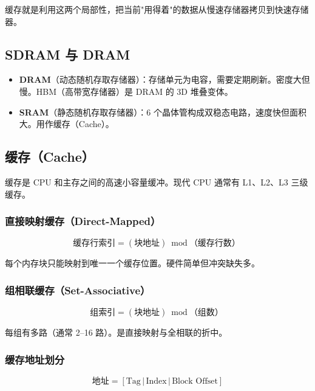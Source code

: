 缓存就是利用这两个局部性，把当前"用得着"的数据从慢速存储器拷贝到快速存储器。

\subsection{SDRAM 与 DRAM}

\begin{itemize}
    \item \textbf{DRAM}（动态随机存取存储器）：存储单元为电容，需要定期刷新。密度大但慢。HBM（高带宽存储器）是 DRAM 的 3D 堆叠变体。
    \item \textbf{SRAM}（静态随机存取存储器）：6 个晶体管构成双稳态电路，速度快但面积大。用作缓存（Cache）。
\end{itemize}

\subsection{缓存（Cache）}

缓存是 CPU 和主存之间的高速小容量缓冲。现代 CPU 通常有 L1、L2、L3 三级缓存。

\subsubsection{直接映射缓存（Direct-Mapped）}

\begin{equation}
\text{缓存行索引} = (\text{块地址}) \bmod \text{（缓存行数）}
\end{equation}

每个内存块只能映射到唯一一个缓存位置。硬件简单但冲突缺失多。

\subsubsection{组相联缓存（Set-Associative）}

\begin{equation}
\text{组索引} = (\text{块地址}) \bmod \text{（组数）}
\end{equation}

每组有多路（通常 2–16 路）。是直接映射与全相联的折中。

\subsubsection{缓存地址划分}

\[
\text{地址} = [\text{Tag} \,|\, \text{Index} \,|\, \text{Block Offset}]
\]


